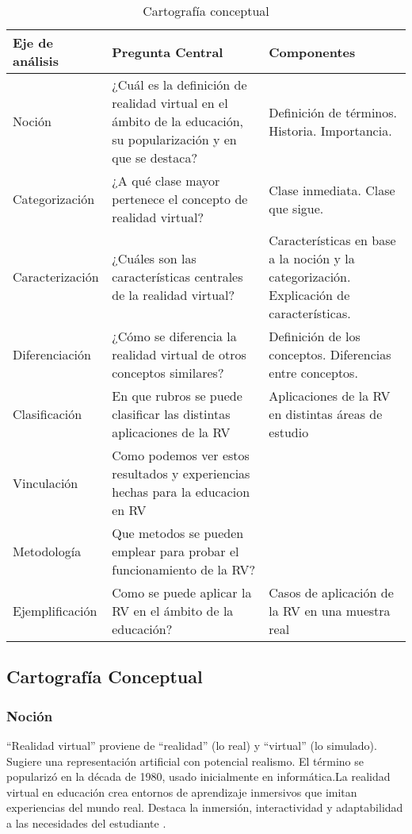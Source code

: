 \begin{table}[!h]
   \caption{Cartografía conceptual}
   \begin{tabular}{p{3.5cm}|p{4.5cm}|p{4.2cm}}
      Eje de análisis & Pregunta Central & Componentes\\
      \hline
      Noción & ¿Cuál es la definición de realidad virtual en el ámbito de la educación, su popularización y en que se destaca? & Definición de términos. Historia. Importancia.\\
      Categorización & ¿A qué clase mayor pertenece el concepto de realidad virtual? & Clase inmediata. Clase que sigue.\\
      Caracterización & ¿Cuáles son las características centrales de la realidad virtual? & Características en base a la noción y la categorización. Explicación de características.\\
      Diferenciación & ¿Cómo se diferencia la realidad virtual de otros conceptos similares? & Definición de los conceptos. Diferencias entre conceptos.\\
      Clasificación & En que rubros se puede clasificar las distintas aplicaciones de la RV & Aplicaciones de la RV en distintas áreas de estudio\\
      Vinculación & Como podemos ver estos resultados y experiencias hechas para la educacion en RV&\\
      Metodología & Que metodos se pueden emplear para probar el funcionamiento de la RV?&\\
      Ejemplificación & Como se puede aplicar la RV en el ámbito de la educación? & Casos de aplicación de la RV en una muestra real\\
   \end{tabular}
\end{table}

\subsection{Cartografía Conceptual}

\subsubsection{Noción}

“Realidad virtual” proviene de “realidad” (lo real) y “virtual” (lo simulado). Sugiere una representación artificial con potencial realismo. El término se popularizó en la década de 1980, usado inicialmente en informática.La realidad virtual en educación crea entornos de aprendizaje inmersivos que imitan experiencias del mundo real. Destaca la inmersión, interactividad y adaptabilidad a las necesidades del estudiante \parencite{zheng1998virtual}.

